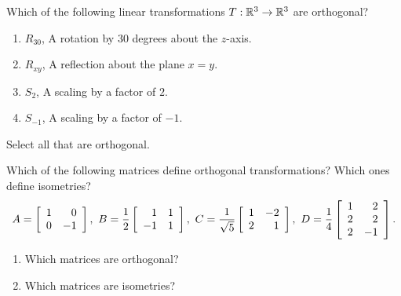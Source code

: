 \documentclass{ximera}
\author{Zack Reed}
\begin{document}
\begin{problem}
  Which of the following linear transformations $T:\R^3\to\R^3$ are
  orthogonal?
  \begin{enumerate}
  \item $R_{30}$, A rotation by 30 degrees about the $z$-axis.
  \item $R_{xy}$, A reflection about the plane $x=y$.
  \item $S_2$, A scaling by a factor of $2$.
  \item $S_{-1}$, A scaling by a factor of $-1$.
  \end{enumerate}
  
  
  Select all that are orthogonal.

  \begin{selectAll}
  \end{selectAll}
  
\end{problem}

\begin{problem}
  Which of the following matrices define orthogonal transformations?
  Which ones define isometries?
  \begin{equation*}
    A = \startmat{rr}
      1 &  0 \\
      0 & -1 \\
    \stopmat,\quad
    B = \frac{1}{2}\startmat{rr}
      1 & 1 \\
      -1 & 1 \\
    \stopmat,\quad
    C = \frac{1}{\sqrt{5}}\startmat{rr}
      1 & -2 \\
      2 &  1 \\
    \stopmat,\quad
    D = \frac{1}{4}\startmat{rr}
      1 &  2 \\
      2 &  2 \\
      2 & -1 \\
    \stopmat.
  \end{equation*}
    \begin{enumerate}
      \item Which matrices are orthogonal?
      \begin{selectAll}
      \end{selectAll}
      
      \item Which matrices are isometries?
      \begin{selectAll}
      \end{selectAll}
  \end{enumerate}
\end{problem}
\end{document}
